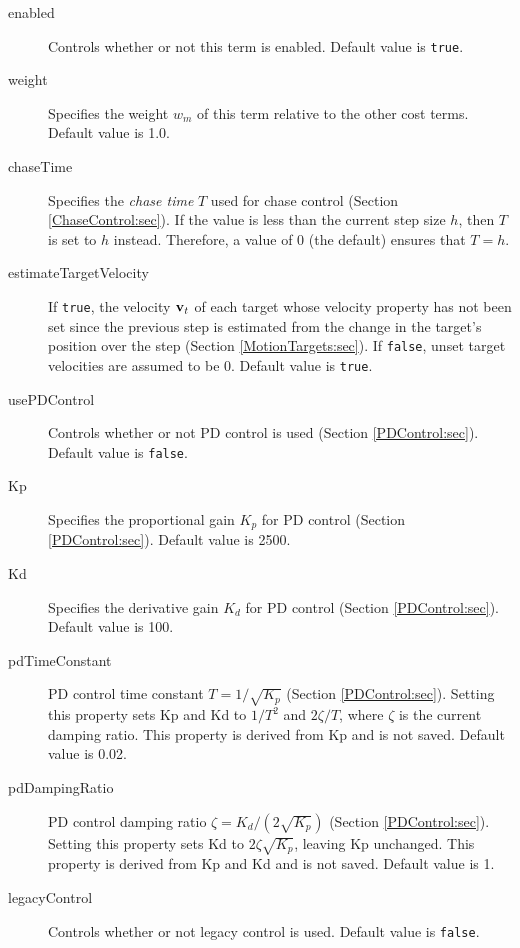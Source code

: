 \begin{description}

\item[enabled]\mbox{}

Controls whether or not this term is enabled. Default value is {\tt true}.

\item[weight]\mbox{}

Specifies the weight $w_m$ of this term relative to the other cost
terms. Default value is 1.0.

\item[chaseTime]\mbox{}

Specifies the {\it chase time} $T$ used for chase control
(Section \ref{ChaseControl:sec}). If the value is less than the current step
size $h$, then $T$ is set to $h$ instead. Therefore, a value of 0 (the default)
ensures that $T = h$.

\item[estimateTargetVelocity]\mbox{}

If {\tt true}, the velocity ${\bf v}_t$ of each target whose {\sf velocity}
property has not been set since the previous step is estimated from the
change in the target's position over the step (Section
\ref{MotionTargets:sec}). If {\tt false}, unset target velocities are
assumed to be 0. Default value is {\tt true}.

\item[usePDControl]\mbox{}

Controls whether or not PD control is used
(Section \ref{PDControl:sec}). Default value is {\tt false}.

\item[Kp]\mbox{}

Specifies the proportional gain $K_p$ for PD control
(Section \ref{PDControl:sec}). Default value is 2500.

\item[Kd]\mbox{}

Specifies the derivative gain $K_d$ for PD control
(Section \ref{PDControl:sec}). Default value is 100.

\item[pdTimeConstant]\mbox{}

PD control time constant $T = 1/\sqrt{K_p}$ (Section
\ref{PDControl:sec}). Setting this property sets {\sf Kp} and {\sf Kd} to
$1/T^2$ and $2\zeta/T$, where $\zeta$ is the current damping ratio. This
property is derived from {\sf Kp} and is not saved. Default value is 0.02.

\item[pdDampingRatio]\mbox{}

PD control damping ratio $\zeta = K_d/(2\sqrt{K_p})$ (Section
\ref{PDControl:sec}). Setting this property sets {\sf Kd} to $2 \zeta
\sqrt{K_p}$, leaving {\sf Kp} unchanged. This property is derived from {\sf
Kp} and {\sf Kd} and is not saved. Default value is 1.

\item[legacyControl]\mbox{}

Controls whether or not legacy control is used.
Default value is {\tt false}.

\end{description}


